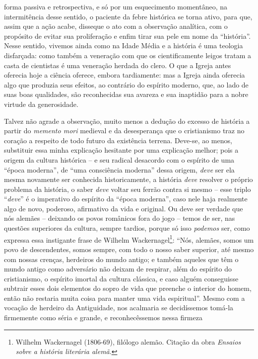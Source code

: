 forma passiva e retrospectiva, e só por um esquecimento momentâneo, na
intermitência desse sentido, o paciente da febre histórica se torna
ativo, para que, assim que a ação acabe, disseque o ato com a observação
analítica, com o propósito de evitar sua proliferação e enfim tirar sua
pele em nome da ``história''. Nesse sentido, vivemos ainda como na Idade
Média e a história é uma teologia disfarçada: como também a veneração
com que os cientificamente leigos tratam a casta de cientistas é uma
veneração herdada do clero. O que a Igreja antes oferecia hoje a ciência
oferece, embora tardiamente: mas a Igreja ainda oferecia algo que
produzia seus efeitos, ao contrário do espírito moderno, que, ao lado de
suas boas qualidades, são reconhecidas sua avareza e sua inaptidão para
a nobre virtude da generosidade.

Talvez não agrade a observação, muito menos a dedução do excesso de
história a partir do \emph{memento mori} medieval e da desesperança que
o cristianismo traz no coração a respeito de todo futuro da existência
terrena. Deve-se, ao menos, substituir essa minha explicação hesitante
por uma explicação melhor; pois a origem da cultura histórica -- e seu
radical desacordo com o espírito de uma ``época moderna'', de ``uma
consciência moderna'' dessa origem, \emph{deve} ser ela mesma novamente
ser conhecida historicamente, a história \emph{deve} resolver o próprio
problema da história, o saber \emph{deve} voltar seu ferrão contra si
mesmo -- esse triplo ``\emph{deve}'' é o imperativo do espírito da
``época moderna'', caso nele haja realmente algo de novo, poderoso,
afirmativo da vida e original. Ou deve ser verdade que nós alemães --
deixando os povos românicos fora do jogo -- temos de ser, nas questões
superiores da cultura, sempre tardios, porque só isso \emph{podemos}
ser, como expressa essa instigante frase de Wilhelm
Wackernagel\footnote{Wilhelm Wackernagel (1806-69), filólogo alemão.
  Citação da obra \emph{Ensaios sobre a história literária alemã}.}:
``Nós, alemães, somos um povo de descendentes, somos sempre, com todo o
nosso saber superior, até mesmo com nossas crenças, herdeiros do mundo
antigo; e também aqueles que têm o mundo antigo como adversário não
deixam de respirar, além do espírito do cristianismo, o espírito imortal
da cultura clássica, e caso alguém conseguisse subtrair esses dois
elementos do sopro de vida que preenche o interior do homem, então não
restaria muita coisa para manter uma vida espiritual''. Mesmo com a
vocação de herdeiro da Antiguidade, nos acalmaria se decidíssemos
tomá-la firmemente como séria e grande, e reconhecêssemos nessa firmeza
